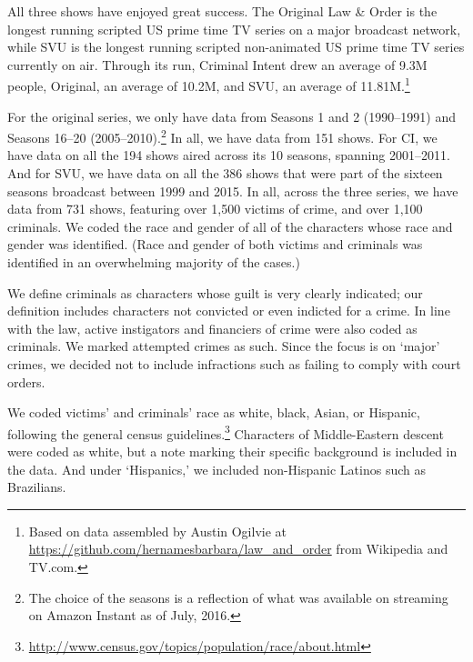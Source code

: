 \documentclass[12pt, letterpaper]{article}
\begin{document}
All three shows have enjoyed great success. The Original Law \& Order is the longest running scripted US prime time TV series on a major broadcast network, while SVU is the longest running scripted non-animated US prime time TV series currently on air. Through its run, Criminal Intent drew an average of 9.3M people, Original, an average of 10.2M, and SVU, an average of 11.81M.\footnote{Based on data assembled by Austin Ogilvie at \href{https://github.com/hernamesbarbara/law_and_order}{https://github.com/hernamesbarbara/law\_and\_order} from Wikipedia and TV.com.}

For the original series, we only have data from Seasons 1 and 2 (1990--1991) and Seasons 16--20 (2005--2010).\footnote{The choice of the seasons is a reflection of what was available on streaming on Amazon Instant as of July, 2016.} In all, we have data from 151 shows. For CI, we have data on all the 194 shows aired across its 10 seasons, spanning 2001--2011. And for SVU, we have data on all the 386 shows that were part of the sixteen seasons broadcast between 1999 and 2015. In all, across the three series, we have data from 731 shows, featuring over 1,500 victims of crime, and over 1,100 criminals. We coded the race and gender of all of the characters whose race and gender was identified. (Race and gender of both victims and criminals was identified in an overwhelming majority of the cases.) 

We define criminals as characters whose guilt is very clearly indicated; our definition includes characters not convicted or even indicted for a crime. In line with the law, active instigators and financiers of crime were also coded as criminals. We marked attempted crimes as such. Since the focus is on `major' crimes, we decided not to include infractions such as failing to comply with court orders. 

We coded victims' and criminals' race as white, black, Asian, or Hispanic, following the general census guidelines.\footnote{\url{http://www.census.gov/topics/population/race/about.html}} Characters of Middle-Eastern descent were coded as white, but a note marking their specific background is included in the data. And under `Hispanics,' we included non-Hispanic Latinos such as Brazilians.
\end{document}

